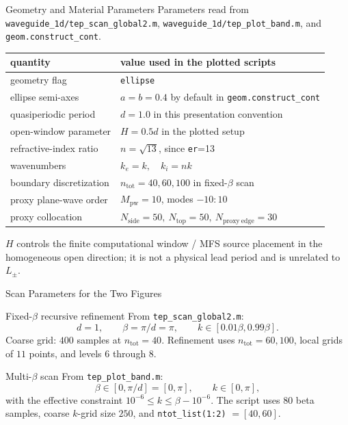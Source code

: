 \documentclass[aspectratio=169]{beamer}
\begin{document}
\begin{frame}{Geometry and Material Parameters}
  \footnotesize
  Parameters read from \texttt{waveguide\_1d/tep\_scan\_global2.m},
  \texttt{waveguide\_1d/tep\_plot\_band.m}, and \texttt{geom.construct\_cont}.
  \vspace{0.2em}

  \begin{center}
  \renewcommand{\arraystretch}{1.08}
  \begin{tabular}{ll}
    \hline
    quantity & value used in the plotted scripts\\
    \hline
    geometry flag & \texttt{ellipse}\\
    ellipse semi-axes & \(a=b=0.4\) by default in \texttt{geom.construct\_cont}\\
    quasiperiodic period & \(d=1.0\) in this presentation convention\\
    open-window parameter & \(H=0.5d\) in the plotted setup\\
    refractive-index ratio & \(n=\sqrt{13}\), since \texttt{er}=13\\
    wavenumbers & \(k_e=k,\quad k_i=nk\)\\
    boundary discretization & \(n_{\mathrm{tot}}=40,60,100\) in fixed-\(\beta\) scan\\
    proxy plane-wave order & \(M_{\mathrm{pw}}=10\), modes \(-10{:}10\)\\
    proxy collocation & \(N_{\mathrm{side}}=50,\ N_{\mathrm{top}}=50,\ N_{\mathrm{proxy\ edge}}=30\)\\
    \hline
  \end{tabular}
  \end{center}
  \vspace{0.1em}
  \(H\) controls the finite computational window / MFS source placement in
  the homogeneous open direction; it is not a physical lead period and is
  unrelated to \(L_\pm\).
\end{frame}

\begin{frame}{Scan Parameters for the Two Figures}
  \small
  \begin{block}{Fixed-\(\beta\) recursive refinement}
    From \texttt{tep\_scan\_global2.m}:
    \[
      d=1,\qquad \beta=\pi/d=\pi,\qquad
      k\in[0.01\beta,0.99\beta].
    \]
    Coarse grid: \(400\) samples at \(n_{\mathrm{tot}}=40\).
    Refinement uses \(n_{\mathrm{tot}}=60,100\), local grids of \(11\)
    points, and levels \(6\) through \(8\).
  \end{block}

  \begin{block}{Multi-\(\beta\) scan}
    From \texttt{tep\_plot\_band.m}:
    \[
      \beta\in[0,\pi/d]=[0,\pi],
      \qquad
      k\in[0,\pi],
    \]
    with the effective constraint \(10^{-6}\le k\le\beta-10^{-6}\).
    The script uses \(80\) beta samples, coarse \(k\)-grid size \(250\),
    and \texttt{ntot\_list(1:2)} \(=[40,60]\).
  \end{block}
\end{frame}
\end{document}
